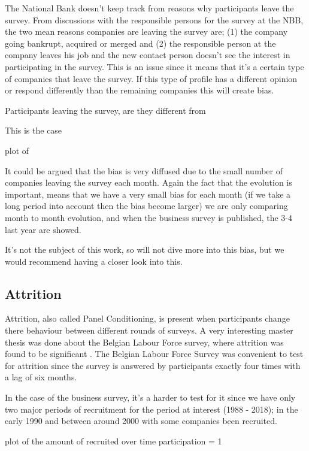 \documentclass[12pt,a4paper,oneside]{book}
\begin{document}
The National Bank doesn't keep track from reasons why participants leave the survey. From discussions with the responsible persons for the survey at the NBB, the two mean reasons companies are leaving the survey are; (1) the company going bankrupt, acquired or merged and (2) the responsible person at the company leaves his job and the new contact person doesn't see the interest in participating in the survey.
This is an issue since it means that it's a certain type of companies that leave the survey. If this type of profile has a different opinion or respond differently than the remaining companies this will create bias. 

Participants leaving the survey, are they different from 

This is the case

plot of 

It could be argued that the bias is very diffused due to the small number of companies leaving the survey each month. Again the fact that the evolution is important, means that we have a very small bias for each month (if we take a long period into account then the bias become larger) we are only comparing month to month evolution, and when the business survey is published, the 3-4 last year are showed.

It's not the subject of this work, so will not dive more into this bias, but we would recommend having a closer look into this.

\subsection{Attrition}

Attrition, also called Panel Conditioning, is present when participants change there behaviour between different rounds of surveys. 
A very interesting master thesis was done about the Belgian Labour Force survey, where attrition was found to be significant \cite{priyana_hardjawidjaksana_investigating_2019}. 
The Belgian Labour Force Survey was convenient to test for attrition since the survey is answered by participants exactly four times with a lag of six months.

In the case of the business survey, it's a harder to test for it since we have only two major periods of recruitment for the period at interest (1988 - 2018); in the early 1990 and between around 2000 with some companies been recruited. 

plot of the amount of recruited over time participation = 1
\end{document}
